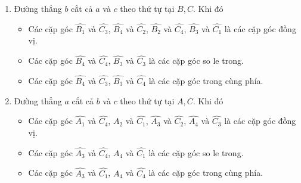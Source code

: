 \begin{vd}
{\begin{enumerate}[TH1.]
{}
\item Đường thẳng $b$ cắt cả $a$ và $c$ theo thứ tự tại $B, C$. Khi đó
\begin{itemize}
\item Các cặp góc $\widehat{B_1}$ và $\widehat{C_3}$, $\widehat{B_4}$ và $\widehat{C_2}$, $\widehat{B_2}$ và $\widehat{C_4}$, $\widehat{B_3}$ và $\widehat{C_1}$ là các cặp góc đồng vị.
\item Các cặp góc $\widehat{B_4}$ và $\widehat{C_4}$, $\widehat{B_3}$ và $\widehat{C_3}$ là các cặp góc so le trong.
\item Các cặp góc $\widehat{B_4}$ và $\widehat{C_3}$, $\widehat{B_3}$ và $\widehat{C_4}$ là các cặp góc trong cùng phía.
\end{itemize}
\item Đường thẳng $a$ cắt cả $b$ và $c$ theo thứ tự tại $A, C$. Khi đó 
\begin{itemize}
\item Các cặp góc $\widehat{A_1}$ và $\widehat{C_4}$, $\widehat{A_2}$ và $\widehat{C_1}$, $\widehat{A_3}$ và $\widehat{C_2}$, $\widehat{A_4}$ và $\widehat{C_3}$ là các cặp góc đồng vị.
\item Các cặp góc $\widehat{A_3}$ và $\widehat{C_4}$, $\widehat{A_4}$ và $\widehat{C_1}$ là các cặp góc so le trong.
\item Các cặp góc $\widehat{A_3}$ và $\widehat{C_1}$, $\widehat{A_4}$ và $\widehat{C_4}$ là các cặp góc trong cùng phía.
\end{itemize}
\end{enumerate}
}
\end{vd}

